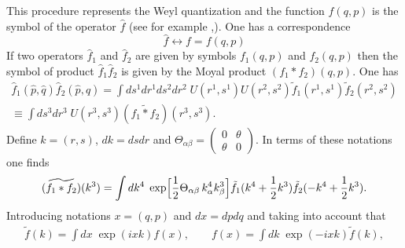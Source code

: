 \documentclass[a4paper,12pt]{article}
\begin{document}
This procedure represents  the Weyl quantization and the function $f(q,p)$
is  the  symbol of the operator $\hat{f}$
(see for example \cite{Berezin},\cite{9907114}).
One has a correspondence
\begin{equation}
\hat{f} \longleftrightarrow f=f(q,p)
\end{equation}
If two operators $\hat{f}_1$ and $\hat{f}_2$ are given by symbols
$f_1(q,p)$ and $f_2(q,p)$
then the symbol of product $\hat{f}_1\hat{f}_2$ is given by the
Moyal product $(f_1* f_2)(q,p)$.
One has
\begin{multline}
\hat{f}_{1}(\hat{p},\hat{q})\hat{f}_{2}(\hat{p},\hat{q})
=\int ds^{1}dr^{1}ds^{2}dr^{2}\;
U(r^{1},s^{1})U(r^{2},s^{2})\tilde{f}_{1}(r^{1},s^{1})
\tilde{f}_{2}(r^{2},s^{2})\\
\equiv\int ds^{3}dr^{3}\; U(r^{3},s^{3})(\widetilde{f_{1}*f_{2}})
(r^{3},s^{3}).
\label{opermultiply}
\end{multline}
Define $k=(r,s)$,  $dk=dsdr$ and
$\Theta_{\alpha\beta}=\begin{pmatrix}
  0 & \theta\\
  \theta & 0
\end{pmatrix}$.
In terms of these notations one finds
\begin{gather}
\label{ff}
(\widetilde{f_{1}*f_{2}})(k^3)
=\int dk^4\;
\exp\Bigl[\frac{1}{2}\Theta_{\alpha\beta}\,k^{4}_{\alpha}k^{3}_{\beta}\Bigr]
\tilde{f}_{1}(k^4+\frac12 k^3)\tilde{f}_{2}(-k^4+\frac12 k^3).
\end{gather}
Introducing notations  $x=(q,p)$ and  $dx=dpdq$ and taking into account that
\begin{gather}
\tilde{f}(k)=\int dx\; \exp(ixk)f(x),\qquad
f(x)=\int dk\; \exp(-ixk)\tilde{f}(k),
\end{gather}
\end{document}
